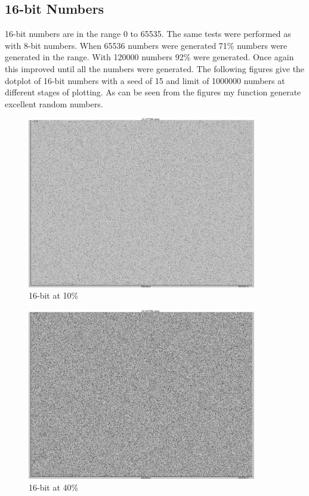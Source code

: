 \documentclass[a4paper,11pt,titlepage]{article}
\begin{document}
\subsection{16-bit Numbers}
16-bit numbers are in the range 0 to 65535. The same tests were performed as with 8-bit numbers. When 65536 numbers were generated 71\% numbers were generated in the range. With 120000 numbers 92\% were generated. Once again this improved until all the numbers were generated. The following figures give the dotplot of 16-bit numbers with a seed of 15 and limit of 1000000 numbers at different stages of plotting. As can be seen from the figures my function generate excellent random numbers.
\begin{figure}[htbp]
   \centering
   \includegraphics[width=10cm]{snapshot1.png}
   \caption{16-bit at 10\%}
   \label{Figure:figex}
\end{figure}
\begin{figure}[htbp]
   \centering
   \includegraphics[width=10cm]{snapshot4.png}
   \caption{16-bit at 40\%}
   \label{Figure:figex}
\end{figure}
\end{document}
